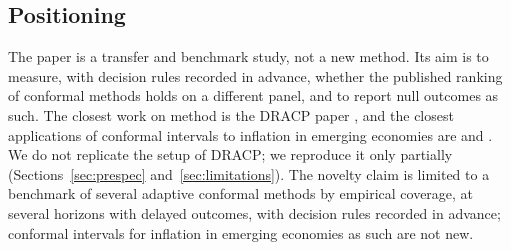\subsection{Positioning}

The paper is a transfer and benchmark study, not a new method. Its aim is to measure, with decision rules recorded in advance, whether the published ranking of conformal methods holds on a different panel, and to report null outcomes as such. The closest work on method is the DRACP paper \citep{oancea2026dracp}, and the closest applications of conformal intervals to inflation in emerging economies are \citet{sengupta2025fewnet} and \citet{brahem2026tunisia}. We do not replicate the setup of DRACP; we reproduce it only partially (Sections~\ref{sec:prespec} and~\ref{sec:limitations}). The novelty claim is limited to a benchmark of several adaptive conformal methods by empirical coverage, at several horizons with delayed outcomes, with decision rules recorded in advance; conformal intervals for inflation in emerging economies as such are not new.
